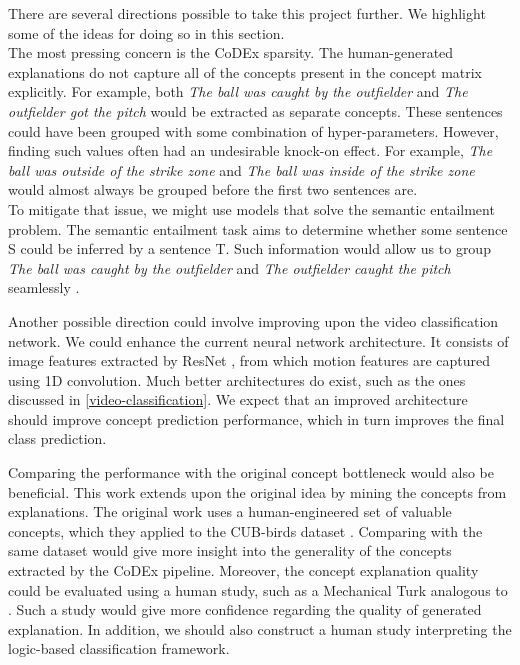 There are several directions possible to take this project further. We highlight some of the ideas for doing so in this section. \\

The most pressing concern is the CoDEx sparsity.
The human-generated explanations do not capture all of the concepts present in the concept matrix explicitly.
For example, both \emph{The ball was caught by the outfielder} and \emph{The outfielder got the pitch} would be extracted as separate concepts.
These sentences could have been grouped with some combination of hyper-parameters. 
However, finding such values often had an undesirable knock-on effect.
For example, \emph{The ball was outside of the strike zone} and \emph{The ball was inside of the strike zone} would almost always be grouped before the first two sentences are. \\
To mitigate that issue, we might use models that solve the semantic entailment problem.
The semantic entailment task aims to determine whether some sentence S could be inferred by a sentence T.
Such information would allow us to group \emph{The ball was caught by the outfielder} and \emph{The outfielder caught the pitch} seamlessly \cite{RefWorks:RefID:85-salvo2005inference}.


Another possible direction could involve improving upon the video classification network.
We could enhance the current neural network architecture.
It consists of image features extracted by ResNet \cite{RefWorks:RefID:86-he2016deep}, from which motion features are captured using 1D convolution.
Much better architectures do exist, such as the ones discussed in \ref{video-classification}.
We expect that an improved architecture should improve concept prediction performance, which in turn improves the final class prediction.

Comparing the performance with the original concept bottleneck \cite{RefWorks:RefID:35-koh2020concept} would also be beneficial.
This work extends upon the original idea by mining the concepts from explanations.
The original work uses a human-engineered set of valuable concepts, which they applied to the CUB-birds dataset \cite{RefWorks:RefID:69-wah2011caltech-ucsd}.
Comparing with the same dataset would give more insight into the generality of the concepts extracted by the CoDEx pipeline.
Moreover, the concept explanation quality could be evaluated using a human study, such as a Mechanical Turk analogous to \cite{RefWorks:RefID:16-2021automatic}.
Such a study would give more confidence regarding the quality of generated explanation.
In addition, we should also construct a human study interpreting the logic-based classification framework.

